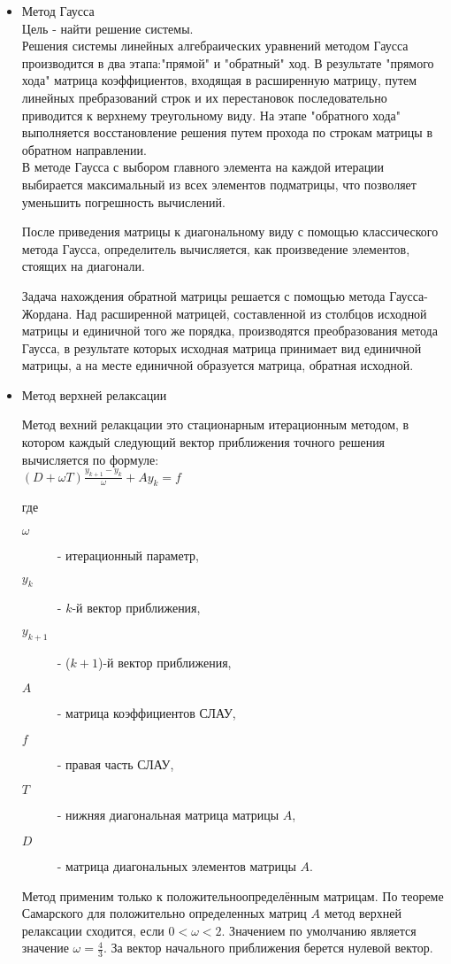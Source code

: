 \documentclass[a4paper,12pt,titlepage,finall]{article}
\begin{document}
\begin{itemize}
\item Метод Гаусса\\
Цель - найти решение системы.\\
Решения системы линейных алгебраических уравнений методом Гаусса
производится в два этапа:"прямой" и "обратный" ход.
В результате "прямого хода" матрица коэффициентов, входящая в расширенную матрицу,
путем линейных пребразований строк и их перестановок 
последовательно приводится к верхнему треугольному виду.
На этапе "обратного хода" выполняется восстановление решения путем
прохода по строкам матрицы в обратном направлении.\\
В методе Гаусса с выбором главного элемента
на каждой итерации выбирается максимальный из всех элементов подматрицы, что позволяет
уменьшить погрешность вычислений.
 
После приведения матрицы к диагональному виду с помощью классического метода Гаусса, определитель вычисляется, как произведение элементов, стоящих на диагонали.

Задача нахождения обратной матрицы решается с помощью метода Гаусса-Жордана. 
Над расширенной матрицей, составленной из столбцов исходной матрицы и единичной
того же порядка, производятся преобразования метода Гаусса, в результате которых
исходная матрица принимает вид единичной матрицы, а на месте единичной образуется
матрица, обратная исходной.\\
\item Метод верхней релаксации

Метод вехний релакцации это стационарным итерационным методом, 
в котором каждый следующий вектор приближения точного решения вычисляется по формуле:\\
$ (D + \omega T) \frac{y_{k+1} - y_k}{\omega} + A y_k = f $

где 

\begin{description}
    \item[$\omega$] - итерационный параметр, \\
    \item[$y_k$] - $k$-й вектор приближения, \\
    \item[$y_{k+1}$] - ($k+1$)-й вектор приближения, \\
    \item[$A$] - матрица коэффициентов СЛАУ, \\
    \item[$f$] - правая часть СЛАУ, \\
    \item[$T$] - нижняя диагональная матрица матрицы $A$, \\
    \item[$D$] - матрица диагональных элементов матрицы $A$. \\
\end{description}
Метод применим только к положительноопределённым матрицам.
По теореме Самарского для положительно определенных матриц $A$
метод верхней релаксации сходится, если $0 < \omega < 2$. Значением по умолчанию является значение $\omega = \frac{4}{3}$.
За вектор начального приближения берется нулевой вектор.
\end{itemize}
\newpage
\end{document}
